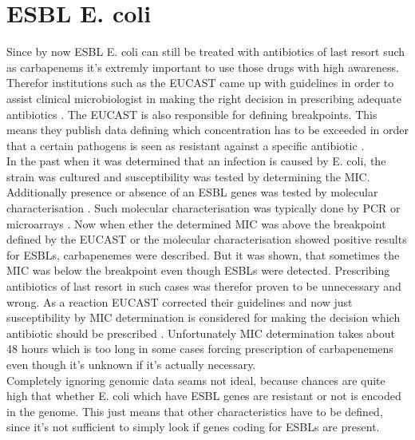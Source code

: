 \section{ESBL E. coli}
Since by now ESBL E. coli can still be treated with antibiotics of last resort such as carbapenems it's extremly important to use those drugs with high awareness. Therefor institutions such as the EUCAST came up with guidelines in order to assist clinical microbiologist in making the right decision in prescribing adequate antibiotics \cite{leclercq_eucast_2013}. The EUCAST is also responsible for defining breakpoints. This means they publish data defining which concentration has to be exceeded in order that a certain pathogens is seen as resistant against a specific antibiotic \cite{leclercq_eucast_2013}. \\
In the past when it was determined that an infection is caused by E. coli, the strain was cultured and susceptibility was tested by determining the MIC. Additionally presence or absence of an ESBL genes was tested by molecular characterisation \cite{kahlmeter_breakpoints_2008}. Such molecular characterisation was typically done by PCR or microarrays \cite{arlet_molecular_1995}. Now when ether the determined MIC was above the breakpoint defined by the EUCAST or the molecular characterisation showed positive results for ESBLs, carbapenemes were described. But it was shown, that sometimes the MIC was below the breakpoint even though ESBLs were detected. Prescribing antibiotics of last resort in such cases was therefor proven to be unnecessary and wrong. As a reaction EUCAST corrected their guidelines and now just susceptibility by MIC determination is considered for making the decision which antibiotic should be prescribed \cite{leclercq_eucast_2013}. Unfortunately MIC determination takes about 48 hours which is too long in some cases forcing prescription of carbapenemens even though it's unknown if it's actually necessary.\\
Completely ignoring genomic data seams not ideal, because chances are quite high that whether E. coli which have ESBL genes are resistant or not is encoded in the genome. This just means that other characteristics have to be defined, since it's not sufficient to simply look if genes coding for ESBLs are present.

